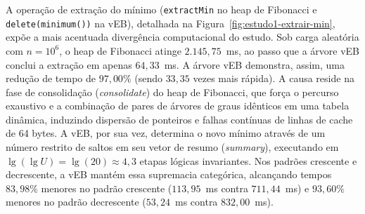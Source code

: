 \documentclass[12pt,a4paper]{report}
\begin{document}
A operação de extração do mínimo (\texttt{extractMin} no heap de Fibonacci e \texttt{delete(minimum())} na vEB), detalhada na Figura~\ref{fig:estudo1-extrair-min}, expõe a mais acentuada divergência computacional do estudo. Sob carga aleatória com $n = 10^6$, o heap de Fibonacci atinge $2.145{,}75$~ms, ao passo que a árvore vEB conclui a extração em apenas $64{,}33$~ms. A árvore vEB demonstra, assim, uma redução de tempo de $97{,}00\%$ (sendo $33{,}35$ vezes mais rápida). A causa reside na fase de consolidação (\textit{consolidate}) do heap de Fibonacci, que força o percurso exaustivo e a combinação de pares de árvores de graus idênticos em uma tabela dinâmica, induzindo dispersão de ponteiros e falhas contínuas de linhas de cache de 64 bytes. A vEB, por sua vez, determina o novo mínimo através de um número restrito de saltos em seu vetor de resumo (\textit{summary}), executando em $\lg(\lg U) = \lg(20) \approx 4{,}3$ etapas lógicas invariantes. Nos padrões crescente e decrescente, a vEB mantém essa supremacia categórica, alcançando tempos $83{,}98\%$ menores no padrão crescente ($113{,}95$~ms contra $711{,}44$~ms) e $93{,}60\%$ menores no padrão decrescente ($53{,}24$~ms contra $832{,}00$~ms).
\end{document}

